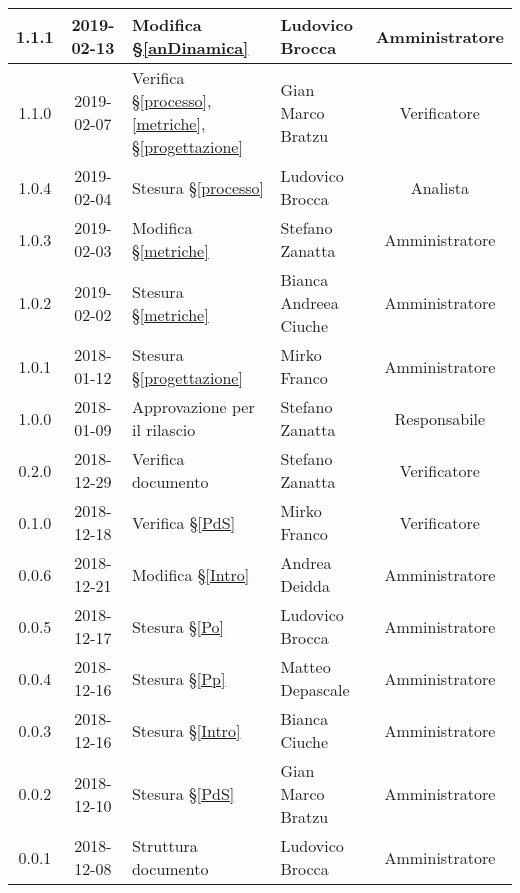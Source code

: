 \begin{center}
\begin{tabularx}{\textwidth}{|c|c|X|X|c|}
			\hline
			1.1.1 &2019-02-13 &Modifica \S\ref{anDinamica} &Ludovico Brocca& Amministratore\\
			\hline
			1.1.0 &2019-02-07 &Verifica \S\ref{processo}, \ref{metriche}, \S\ref{progettazione} &Gian Marco Bratzu& Verificatore\\
			\hline
			1.0.4 &2019-02-04&Stesura \S\ref{processo}&Ludovico Brocca& Analista\\
			\hline
			1.0.3 & 2019-02-03 & Modifica \S\ref{metriche} & Stefano Zanatta & Amministratore\\
			\hline
			1.0.2 & 2019-02-02 & Stesura \S\ref{metriche} & Bianca Andreea Ciuche & Amministratore\\
			\hline
			1.0.1 & 2018-01-12 & Stesura \S\ref{progettazione} & Mirko Franco & Amministratore \\
			\hline
			1.0.0 & 2018-01-09 & Approvazione per il rilascio & Stefano Zanatta & Responsabile\\
			\hline
			0.2.0 & 2018-12-29 & Verifica documento & Stefano Zanatta & Verificatore\\
			\hline
			0.1.0 & 2018-12-18 & Verifica \S\ref{PdS} & Mirko Franco & Verificatore\\
			\hline
			0.0.6 & 2018-12-21 & Modifica \S\ref{Intro} & Andrea Deidda & Amministratore\\
			\hline
			0.0.5 & 2018-12-17 & Stesura \S\ref{Po} & Ludovico Brocca & Amministratore\\
			\hline
			0.0.4 & 2018-12-16 & Stesura \S\ref{Pp} & Matteo Depascale & Amministratore\\
			\hline
			0.0.3 & 2018-12-16 & Stesura \S\ref{Intro} & Bianca Ciuche & Amministratore\\
			\hline
			0.0.2 & 2018-12-10 & Stesura \S\ref{PdS} & Gian Marco Bratzu & Amministratore\\	
			\hline
			0.0.1 & 2018-12-08 & Struttura documento  & Ludovico Brocca & Amministratore\\
			\hline
	\end{tabularx}
	\end{center}

\newpage